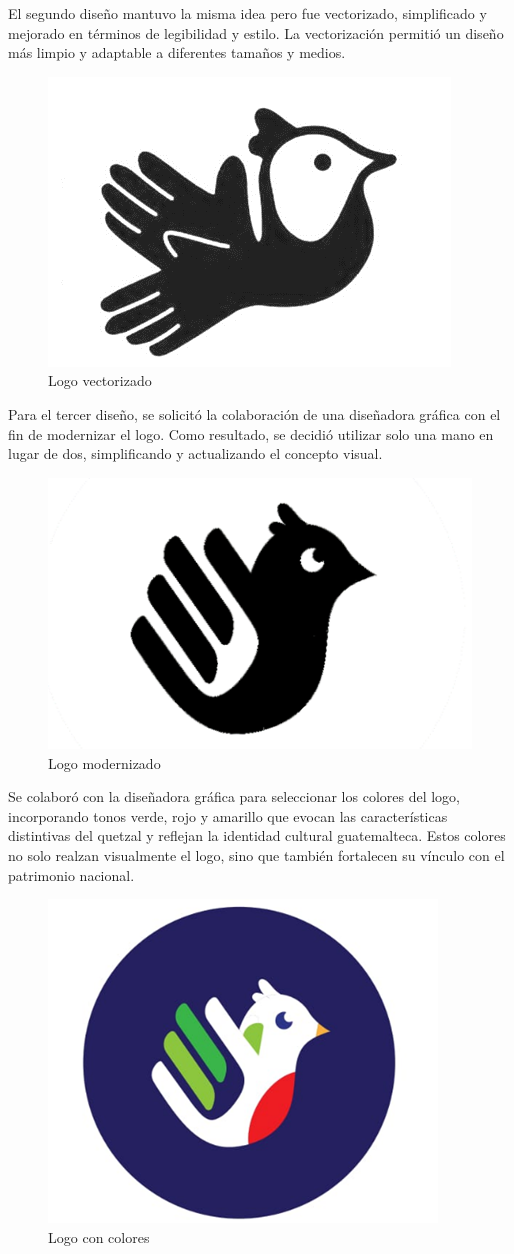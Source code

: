 El segundo diseño mantuvo la misma idea pero fue vectorizado, simplificado y mejorado en términos de legibilidad y estilo. La vectorización permitió un diseño más limpio y adaptable a diferentes tamaños y medios.

\begin{figure} [H]
    \centering
    \includegraphics[width=0.4\linewidth]{figuras/logo2.png}
    \caption{Logo vectorizado}
    \label{fig:enter-label}
\end{figure}


Para el tercer diseño, se solicitó la colaboración de una diseñadora gráfica con el fin de modernizar el logo. Como resultado, se decidió utilizar solo una mano en lugar de dos, simplificando y actualizando el concepto visual.

\begin{figure} [H]
    \centering
    \includegraphics[width=0.4\linewidth]{figuras/logo3.png}
    \caption{Logo modernizado}
    \label{fig:enter-label}
\end{figure}

Se colaboró con la diseñadora gráfica para seleccionar los colores del logo, incorporando tonos verde, rojo y amarillo que evocan las características distintivas del quetzal y reflejan la identidad cultural guatemalteca. Estos colores no solo realzan visualmente el logo, sino que también fortalecen su vínculo con el patrimonio nacional.

\begin{figure} [H]
    \centering
    \includegraphics[width=0.4\linewidth]{figuras/logo4.png}
    \caption{Logo con colores}
    \label{fig:enter-label}
\end{figure}


